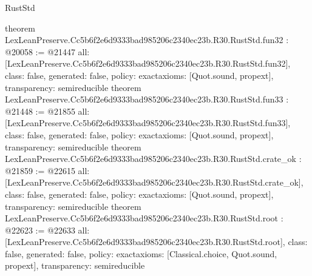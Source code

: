 \begin{lexlean}{RustStd}
\begin{coremodule}
{}
theorem LexLeanPreserve.Cc5b6f2e6d9333bad985206c2340ec23b.R30.RustStd.fun32 : @20058 := @21447 {
  all: [LexLeanPreserve.Cc5b6f2e6d9333bad985206c2340ec23b.R30.RustStd.fun32],
  class: false,
  generated: false,
  policy: exact{axioms: [Quot.sound, propext]},
  transparency: semireducible
}
theorem LexLeanPreserve.Cc5b6f2e6d9333bad985206c2340ec23b.R30.RustStd.fun33 : @21448 := @21855 {
  all: [LexLeanPreserve.Cc5b6f2e6d9333bad985206c2340ec23b.R30.RustStd.fun33],
  class: false,
  generated: false,
  policy: exact{axioms: [Quot.sound, propext]},
  transparency: semireducible
}
theorem LexLeanPreserve.Cc5b6f2e6d9333bad985206c2340ec23b.R30.RustStd.crate_ok : @21859 := @22615 {
  all: [LexLeanPreserve.Cc5b6f2e6d9333bad985206c2340ec23b.R30.RustStd.crate_ok],
  class: false,
  generated: false,
  policy: exact{axioms: [Quot.sound, propext]},
  transparency: semireducible
}
theorem LexLeanPreserve.Cc5b6f2e6d9333bad985206c2340ec23b.R30.RustStd.root : @22623 := @22633 {
  all: [LexLeanPreserve.Cc5b6f2e6d9333bad985206c2340ec23b.R30.RustStd.root],
  class: false,
  generated: false,
  policy: exact{axioms: [Classical.choice, Quot.sound, propext]},
  transparency: semireducible
}


\end{coremodule}
\end{lexlean}
